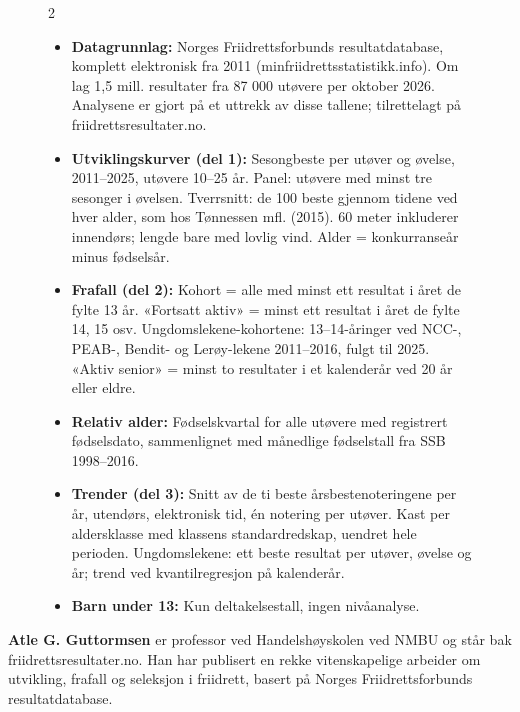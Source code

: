 \begin{figure}[t]
\begin{faktaboks}
\begin{multicols}{2}

\begin{itemize}
\tightlist
\item
  \textbf{Datagrunnlag:} Norges Friidrettsforbunds resultatdatabase, komplett
  elektronisk fra 2011 (minfriidrettsstatistikk.info). Om lag 1,5 mill.
  resultater fra 87 000 utøvere per oktober 2026. Analysene er gjort på et
  uttrekk av disse tallene; tilrettelagt på friidrettsresultater.no.
\item
  \textbf{Utviklingskurver (del 1):} Sesongbeste per utøver og øvelse, 2011--2025,
  utøvere 10--25 år. Panel: utøvere med minst tre sesonger i øvelsen. Tverrsnitt:
  de 100 beste gjennom tidene ved hver alder, som hos Tønnessen mfl. (2015).
  60 meter inkluderer innendørs; lengde bare med lovlig vind. Alder =
  konkurranseår minus fødselsår.
\item
  \textbf{Frafall (del 2):} Kohort = alle med minst ett resultat i året de fylte 13 år.
  «Fortsatt aktiv» = minst ett resultat i året de fylte 14, 15 osv.
  Ungdomslekene-kohortene: 13--14-åringer ved NCC-, PEAB-, Bendit- og
  Lerøy-lekene 2011--2016, fulgt til 2025. «Aktiv senior» = minst to resultater
  i et kalenderår ved 20 år eller eldre.
\item
  \textbf{Relativ alder:} Fødselskvartal for alle utøvere med registrert
  fødselsdato, sammenlignet med månedlige fødselstall fra SSB 1998--2016.
\item
  \textbf{Trender (del 3):} Snitt av de ti beste årsbestenoteringene per år,
  utendørs, elektronisk tid, én notering per utøver. Kast per aldersklasse med
  klassens standardredskap, uendret hele perioden. Ungdomslekene: ett beste
  resultat per utøver, øvelse og år; trend ved kvantilregresjon på kalenderår.
\item
  \textbf{Barn under 13:} Kun deltakelsestall, ingen nivåanalyse.
\end{itemize}

\end{multicols}
\end{faktaboks}
\end{figure}

\begin{forfatterboks}

\textbf{Atle G. Guttormsen} er professor ved Handelshøyskolen ved NMBU og står bak friidrettsresultater.no. Han har publisert en rekke vitenskapelige arbeider om utvikling, frafall og seleksjon i friidrett, basert på Norges Friidrettsforbunds resultatdatabase.

\end{forfatterboks}

